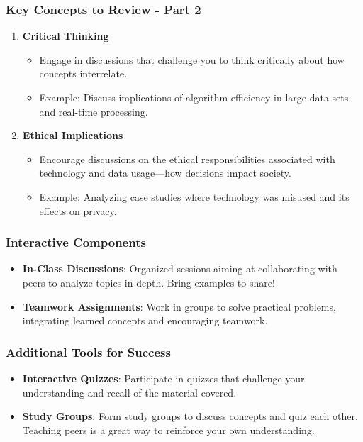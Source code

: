 \documentclass[aspectratio=169]{beamer}
\begin{document}
\begin{frame}[fragile]
    \frametitle{Key Concepts to Review - Part 2}
    \begin{enumerate}[resume]
        \item \textbf{Critical Thinking}
        \begin{itemize}
            \item Engage in discussions that challenge you to think critically about how concepts interrelate.
            \item Example: Discuss implications of algorithm efficiency in large data sets and real-time processing.
        \end{itemize}

        \item \textbf{Ethical Implications}
        \begin{itemize}
            \item Encourage discussions on the ethical responsibilities associated with technology and data usage—how decisions impact society.
            \item Example: Analyzing case studies where technology was misused and its effects on privacy.
        \end{itemize}
    \end{enumerate}
\end{frame}

\begin{frame}[fragile]
    \frametitle{Interactive Components}
    \begin{itemize}
        \item \textbf{In-Class Discussions}: Organized sessions aiming at collaborating with peers to analyze topics in-depth. Bring examples to share!
        \item \textbf{Teamwork Assignments}: Work in groups to solve practical problems, integrating learned concepts and encouraging teamwork. 
    \end{itemize}
\end{frame}

\begin{frame}[fragile]
    \frametitle{Additional Tools for Success}
    \begin{itemize}
        \item \textbf{Interactive Quizzes}: Participate in quizzes that challenge your understanding and recall of the material covered.
        \item \textbf{Study Groups}: Form study groups to discuss concepts and quiz each other. Teaching peers is a great way to reinforce your own understanding.
    \end{itemize}
\end{frame}
\end{document}
